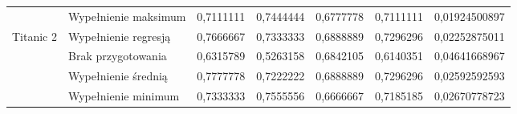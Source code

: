 \documentclass{book}
\begin{document}
\begin{table}[H]
\begin{tabular}{|l|l|r|r|r|r|r|}
                                & Wypełnienie maksimum & 0,7111111                                                                        & \cellcolor[HTML]{67FD9A}0,7444444                                                        & 0,6777778                                                                                          & 0,7111111                                                                       & 0,01924500897                                                                    \\ \cline{2-7} 
    \multirow{-5}{*}{Titanic 2} & Wypełnienie regresją & \cellcolor[HTML]{67FD9A}0,7666667                                                & 0,7333333                                                                                & \cellcolor[HTML]{67FD9A}0,6888889                                                                  & \cellcolor[HTML]{FFCC67}0,7296296                                               & \cellcolor[HTML]{FFCC67}0,02252875011                                            \\ \hline
                                & Brak przygotowania   & 0,6315789                                                                        & 0,5263158                                                                                & 0,6842105                                                                                          & 0,6140351                                                                       & 0,04641668967                                                                    \\ \cline{2-7} 
                                & Wypełnienie średnią  & 0,7777778                                                                        & 0,7222222                                                                                & \cellcolor[HTML]{67FD9A}0,6888889                                                                  & \cellcolor[HTML]{FFCC67}0,7296296                                               & \cellcolor[HTML]{FFCC67}0,02592592593                                            \\ \cline{2-7} 
                                & Wypełnienie minimum  & 0,7333333                                                                        & \cellcolor[HTML]{67FD9A}0,7555556                                                        & 0,6666667                                                                                          & 0,7185185                                                                       & 0,02670778723                                                                    \\ \cline{2-7} 

\end{tabular}
\end{table}
\end{document}

